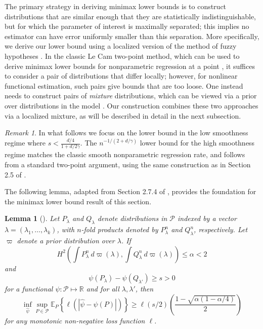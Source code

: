 \documentclass[11pt,twoside]{article}
\newcommand{\E}{\mathbb{E}}
\newcommand{\R}{\mathbb{R}}
\newtheorem{lemma}{Lemma}
\theoremstyle{definition}
\theoremstyle{remark}
\newtheorem{remark}{Remark}
\begin{document}
The primary strategy in deriving minimax lower bounds is to construct distributions that are similar enough that they are statistically indistinguishable, but for which the parameter of interest is maximally separated; this implies no  estimator can have error uniformly smaller than this separation. More specifically, we derive our lower bound using a localized version of the method of fuzzy hypotheses \citep{ibragimov1987some, birge1995estimation, nemirovski2000topics, ingster2003nonparametric, tsybakov2009introduction, robins2009semiparametric}. In the classic Le Cam two-point method, which can be used to derive minimax lower bounds for nonparametric regression at a point \citep{tsybakov2009introduction}, it suffices to consider a pair of distributions that differ locally; however, for nonlinear functional estimation, such pairs give bounds that are too loose. One instead needs to construct pairs of \emph{mixture} distributions, which can be viewed via a prior over distributions in the model \citep{birge1995estimation, tsybakov2009introduction, robins2009semiparametric}. Our construction combines these two approaches via a localized mixture, as will be described in detail in the next subsection. \\

\begin{remark} \label{rem:lowsmooth}
In what follows we focus on the lower bound in the low smoothness regime where $s < \frac{d/4}{1+d/2\gamma}$. The $n^{-1/(2+d/\gamma)}$ lower bound for the high smoothness regime matches the classic smooth nonparametric regression rate, and follows from a standard two-point argument, using the same construction as in Section 2.5 of  \citet{tsybakov2009introduction}. \\
\end{remark}

The following lemma, adapted from Section 2.7.4 of \citet{tsybakov2009introduction}, provides the foundation for the minimax lower bound result of this section. \\


\begin{lemma}[\citet{tsybakov2009introduction}] \label{lem:minimax}
Let $P_\lambda$ and $Q_\lambda$ denote distributions in $\mathcal{P}$ indexed by a vector $\lambda=(\lambda_1,\dots,\lambda_k)$, with $n$-fold products denoted by $P_\lambda^n$ and $Q_\lambda^n$, respectively.  
Let $\varpi$ denote a prior distribution over $\lambda$.  
If 
$$ H^2\left(\int P_\lambda^n \ d\varpi(\lambda), \int Q_\lambda^n \ d\varpi(\lambda) \right) \leq \alpha < 2$$ 
and 
$$ \psi(P_\lambda) - \psi(Q_{\lambda'}) \geq  s >0 $$
for a functional $\psi: \mathcal{P} \mapsto \R$ and for all $\lambda,\lambda'$, 
then
$$ \inf_{\widehat\psi} \sup_{P \in \mathcal{P}} \E_P \left\{ \ell\left( \left| \widehat\psi - \psi(P)\right| \right) \right\} \geq \ell(s/2) \left( \frac{1 - \sqrt{\alpha(1-\alpha/4)}}{2} \right) $$
for any monotonic non-negative loss function $\ell$.
\end{lemma}
\end{document}
